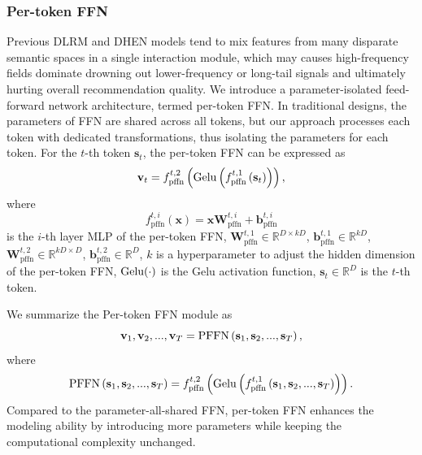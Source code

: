   \subsubsection{Per-token FFN}
    Previous DLRM and DHEN models tend to mix features from many disparate semantic spaces in a single interaction module, which may causes high-frequency fields dominate drowning out lower-frequency or long-tail signals and ultimately hurting overall recommendation quality.
    We introduce a parameter-isolated feed-forward network architecture, termed per-token FFN. In traditional designs, the parameters of FFN are shared across all tokens, but our approach processes each token with dedicated transformations, thus isolating the parameters for each token. For the $t$-th token $\mathbf{s}_t$, the per-token FFN can be expressed as
    \begin{equation}
        \mathbf{v}_t = f_{\text{pffn}}^{t,2} \left({\rm Gelu} \left(f_{\text{pffn}}^{t,1} \left(\mathbf{s}_t \right) \right) \right),
    \end{equation}
    where
    \begin{equation}
        f_{\text{pffn}}^{t,i}(\mathbf{x})=\mathbf{x}\mathbf{W}_{\text{pffn}}^{t, i} + \mathbf{b}_{\text{pffn}}^{t, i}
    \end{equation}
    is the $i$-th layer MLP of the per-token FFN, 
    $\mathbf{W}_{\text{pffn}}^{t, 1} \in \mathbb{R}^{D \times kD}$, 
    $\mathbf{b}_{\text{pffn}}^{t, 1} \in \mathbb{R}^{kD}$,
    $\mathbf{W}_{\text{pffn}}^{t, 2} \in \mathbb{R}^{kD \times D}$, 
    $\mathbf{b}_{\text{pffn}}^{t, 2} \in \mathbb{R}^{D}$,
    $k$ is a hyperparameter to adjust the hidden dimension of the per-token FFN,
    ${\rm Gelu(\cdot)}$ is the Gelu activation function, $\mathbf{s}_t \in \mathbb{R}^{D}$ is the $t$-th token.

    We summarize the Per-token FFN module as
    \begin{equation}
        \mathbf{v}_1, \mathbf{v}_2, ..., \mathbf{v}_T = {\rm PFFN}\left( \mathbf{s}_1, \mathbf{s}_2, ..., \mathbf{s}_T \right), 
    \end{equation}
    where
    \begin{equation}
        {\rm PFFN}\left( \mathbf{s}_1, \mathbf{s}_2, ..., \mathbf{s}_T \right) = f_{\text{pffn}}^{t,2} \left({\rm Gelu} \left(f_{\text{pffn}}^{t,1} \left(\mathbf{s}_1, \mathbf{s}_2, ..., \mathbf{s}_T \right) \right) \right).
    \end{equation}
Compared to the parameter-all-shared FFN, per-token FFN enhances the modeling ability by introducing more parameters while keeping the computational complexity unchanged.

